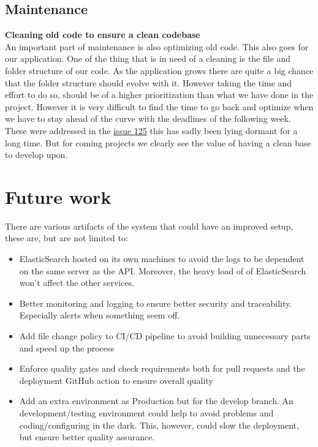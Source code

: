 \documentclass[10pt]{article}
\begin{document}
\subsection{Maintenance}

\textbf{Cleaning old code to ensure a clean codebase}\\
An important part of maintenance is also optimizing old code. This also goes for our application. One of the thing that is in need of a cleaning is the file and folder structure of our code. As the application grows there are quite a big chance that the folder structure should evolve with it. However taking the time and effort to do so, should be of a higher prioritization than what we have done in the project.
However it is very difficult to find the time to go back and optimize when we have to stay ahead of the curve with the deadlines of the following week. 
These were addressed in the  \href{https://github.com/Arklaide/devopsITUproject/issues/125}{issue 125} this has sadly been lying dormant for a long time.
But for coming projects we clearly see the value of having a clean base to develop upon.

\section{Future work}
There are various artifacts of the system that could have an improved setup, these are, but are not limited to:
\begin{itemize}
    \item ElasticSearch hosted on its own machines to avoid the logs to be dependent on the same server as the API. Moreover, the heavy load of of ElasticSearch won't affect the other services.
    \item Better monitoring and logging to ensure better security and traceability. Especially alerts when something seem off.
    \item Add file change policy to CI/CD pipeline to avoid building unnecessary parts and speed up the process
    \item Enforce quality gates and check requirements both for pull requests and the deployment GitHub action to ensure overall quality
    \item Add an extra environment as Production but for the develop branch. An development/testing environment could help to avoid problems and coding/configuring in the dark. This, however, could slow the deployment, but ensure better quality assurance.
\end{itemize}
\end{document}
